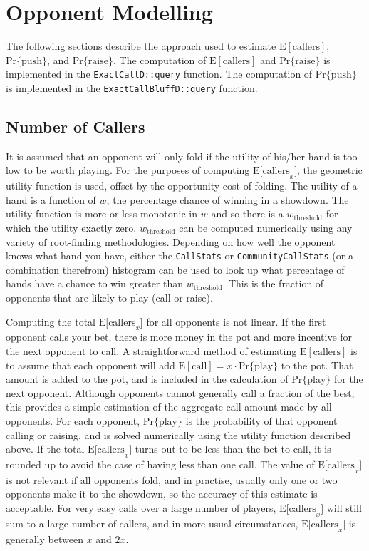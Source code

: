 \section{Opponent Modelling}

The following sections describe the approach used to estimate $\mathrm{E[callers]}$, $\mathrm{Pr\{push\}}$, and $\mathrm{Pr\{raise\}}$.
The computation of $\mathrm{E[callers]}$ and $\mathrm{Pr\{raise\}}$ is implemented in the \texttt{ExactCallD::query} function.
The computation of $\mathrm{Pr\{push\}}$ is implemented in the \texttt{ExactCallBluffD::query} function.

\subsection{Number of Callers}
\label{sec:Callers}
It is assumed that an opponent will only fold if the utility of his/her hand is too low to be worth playing.
For the purposes of computing $\mathrm{E[callers}_x]$, the geometric utility function is used, offset by the opportunity cost of folding.
The utility of a hand is a function of $w$, the percentage chance of winning in a showdown.
The utility function is more or less monotonic in $w$ and so there is a $w_{\mathrm{threshold}}$ for which the utility exactly zero.
$w_{\mathrm{threshold}}$ can be computed numerically using any variety of root-finding methodologies.
Depending on how well the opponent knows what hand you have, either the \texttt{CallStats} or \texttt{CommunityCallStats} (or a combination therefrom) histogram can be used to look up what percentage of hands have a chance to win greater than $w_{\mathrm{threshold}}$.
This is the fraction of opponents that are likely to play (call or raise).


Computing the total $\mathrm{E[callers}_x]$ for all opponents is not linear.
If the first opponent calls your bet, there is more money in the pot and more incentive for the next opponent to call.
A straightforward method of estimating $\mathrm{E[callers]}$ is to assume that each opponent will add $\mathrm{E[call]} = x \cdot \mathrm{Pr\{play\}}$ to the pot.
That amount is added to the pot, and is included in the calculation of $\mathrm{Pr\{play\}}$ for the next opponent.
Although opponents cannot generally call a fraction of the best, this provides a simple estimation of the aggregate call amount made by all opponents.
For each opponent, $\mathrm{Pr\{play\}}$ is the probability of that opponent calling or raising, and is solved numerically using the utility function described above.
If the total $\mathrm{E[callers}_x]$ turns out to be less than the bet to call, it is rounded up to avoid the case of having less than one call.
The value of $\mathrm{E[callers}_x]$ is not relevant if all opponents fold, and in practise, usually only one or two opponents make it to the showdown, so the accuracy of this estimate is acceptable.
For very easy calls over a large number of players, $\mathrm{E[callers}_x]$ will still sum to a large number of callers, and in more usual circumstances, $\mathrm{E[callers}_x]$ is generally between $x$ and $2x$.


